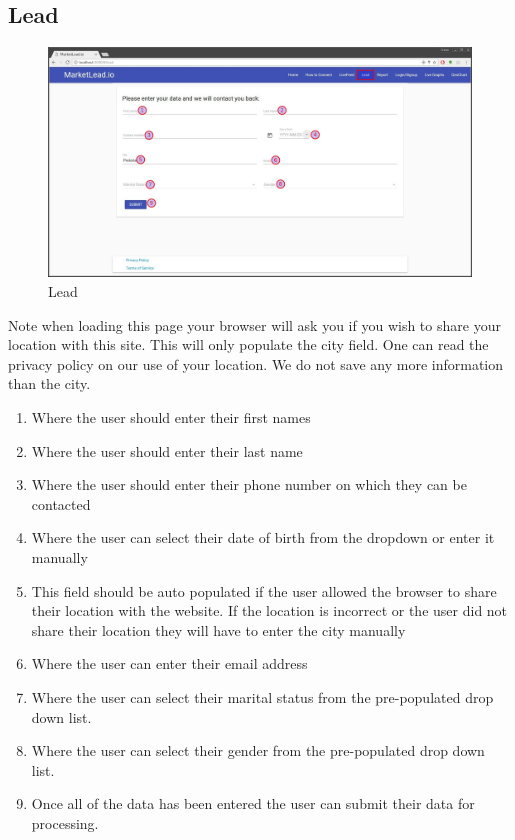 \documentclass{article}
\begin{document}
		\subsection{Lead}
			\begin{figure}[H]
				\includegraphics[width=\textwidth]{images/lead.jpg}
				\caption{Lead}
			\end{figure}
			Note when loading this page your browser will ask you if you wish to share your location with this site. This will only populate the city field. One can read the privacy policy on our use of your location. We do not save any more information than the city.
			\begin{enumerate}
				\item Where the user should enter their first names
				\item Where the user should enter their last name
				\item Where the user should enter their phone number on which they can be contacted
				\item Where the user can select their date of birth from the dropdown or enter it manually
				\item This field should be auto populated if the user allowed the browser to share their location with the website. If the location is incorrect or the user did not share their location they will have to enter the city manually
				\item Where the user can enter their email address
				\item Where the user can select their marital status from the pre-populated drop down list.
				\item Where the user can select their gender from the pre-populated drop down list.
				\item Once all of the data has been entered the user can submit their data for processing.
			\end{enumerate}
\end{document}
